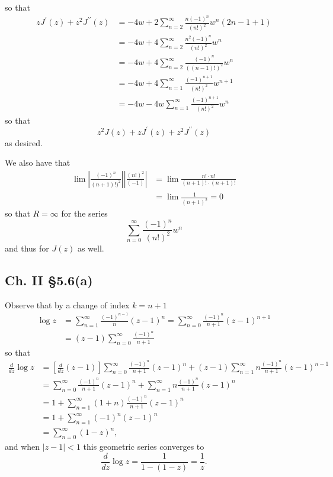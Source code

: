 \documentclass{article}
\begin{document}
so that
\begin{align*}
   z J^\prime(z) + z^2 J^{\prime\prime}(z)
&= -4w
 + 2
   \sum_{n=2}^\infty
     \frac{n(-1)^n}{(n!)^2}
     w^n(2n - 1 + 1) \\
&= -4w
 + 4
   \sum_{n=2}^\infty
     \frac{n^2 (-1)^n}{(n!)^2}
     w^n \\
&= -4w
 + 4
   \sum_{n=2}^\infty
     \frac{(-1)^n}{((n-1)!)^2}
     w^n \\
&= -4w
 + 4
   \sum_{n=1}^\infty
     \frac{(-1)^{n+1}}{(n!)^2} w^{n+1} \\
&= -4w
 - 4w
   \sum_{n=1}^\infty
     \frac{(-1)^{n+1}}{(n!)^2} w^{n}
\end{align*}
so that
$$
z^2 J(z) + z J^\prime(z) + z^2 J^{\prime\prime}(z)
$$
as desired.

We also have that
\begin{align*}
   \lim \left|\frac{(-1)^n}{(n+1)!)^2}\right|
        \left|\frac{(n!)^2}{(-1)}\right|
&= \lim \frac{n! \cdot n!}{(n+1)! \cdot (n+1)!} \\
&= \lim \frac{1}{(n+1)^2} = 0
\end{align*}
so that $R = \infty$ for the series
$$
\sum_{n=0}^\infty \frac{(-1)^n}{(n!)^2} w^n
$$
and thus for $J(z)$ as well.

\subsection*{Ch. II \S 5.6(a)}
Observe that by a change of index $k = n+1$
\begin{align*}
   \log z
&= \sum_{n=1}^\infty \frac{(-1)^{n-1}}{n}(z-1)^n
 = \sum_{n=0}^\infty \frac{(-1)^n}{n+1} (z-1)^{n+1} \\
&= (z-1)\sum_{n=0}^\infty \frac{(-1)^n}{n+1}
\end{align*}
so that
\begin{align*}
   \frac{d}{dz} \log z
&= \left[\frac{d}{dz} (z-1)\right]
   \sum_{n=0}^\infty \frac{(-1)^n}{n+1} (z-1)^n
 + (z-1)\sum_{n=1}^\infty n\frac{(-1)^n}{n+1} (z - 1)^{n-1} \\
&= \sum_{n=0}^\infty \frac{(-1)^n}{n+1} (z-1)^n
 + \sum_{n=1}^\infty n \frac{(-1)^n}{n+1} (z-1)^n \\
&= 1 + \sum_{n=1}^\infty (1 + n) \frac{(-1)^n}{n+1} (z-1)^n \\
&= 1 + \sum_{n=1}^\infty (-1)^n (z-1)^n \\
&= \sum_{n=0}^\infty (1-z)^n,
\end{align*}
and when $|z - 1| < 1$ this geometric series converges to
$$
\frac{d}{dz} \log z = \frac{1}{1 - (1 - z)} = \frac{1}{z}.
$$
\end{document}
